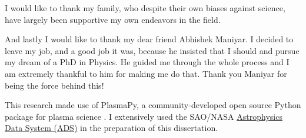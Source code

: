 I would like to thank my family, who despite their own biases against science, have largely been
supportive my own endeavors in the field.

And lastly I would like to thank my dear friend Abhishek Maniyar. I decided to leave my job, and a
good job it was, because he insisted that I should and pursue my dream of a PhD in Physics. He
guided me through the whole process and I am extremely thankful to him for making me do that. Thank
you Maniyar for being the force behind this!

This research made use of PlasmaPy, a community-developed open source Python package for plasma
science \citep{misc:Plasmapy2020}. I extensively used the SAO/NASA
\href{https://ui.adsabs.harvard.edu/}{Astrophysics Data System (ADS)} in the preparation of this
dissertation.